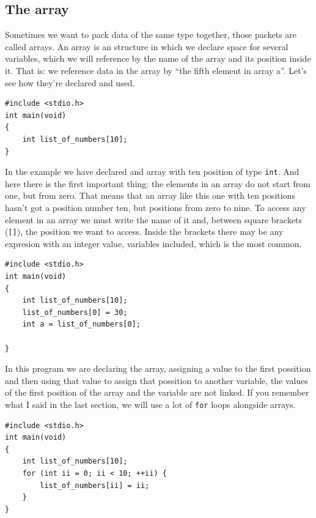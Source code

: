 \documentclass[a4paper]{article}
\begin{document}
\subsection{The array}
Sometimes we want to pack data of the same type together, those packets are
called arrays. An array is an structure in which we declare space for several
variables, which we will reference by the name of the array and its position
inside it. That is: we reference data in the array by ``the fifth element in
array a''. Let's see how they're declared and used.

\noindent
\begin{minipage}[H]{\linewidth}
\mbox{}
\begin{lstlisting}[style=C,
caption={Example of declaration of an array},
label={lst:arrayDeclaration}]
#include <stdio.h>
int main(void)
{
    int list_of_numbers[10];
}
\end{lstlisting}
\end{minipage}

In the example we have declared and array with ten position of type
\texttt{int}. And here there is the first important thing: the elements in an
array do not start from one, but from zero. That means that an array like this
one with ten positions hasn't got a position number ten, but positions from
zero to nine.
To access any element in an array we must write the name of it and, between
square brackets (\verb![]!), the position we want to access. Inside the brackets
there may be any expresion with an integer value, variables included, which
is the most common.

\noindent
\begin{minipage}[H]{\linewidth}
\mbox{}
\begin{lstlisting}[style=C,
caption={Example of ussage of an array},
label={lst:arrayUse}]
#include <stdio.h>
int main(void)
{
    int list_of_numbers[10];
    list_of_numbers[0] = 30;
    int a = list_of_numbers[0];

}
\end{lstlisting}
\end{minipage}

In this program we are declaring the array, assigning a value to the first
possition and then using that value to assign that possition to another
variable, the values of the first position of the array and the variable
are not linked. If you remember what I said in the last section, we will
use a lot of \texttt{for} loops alongside arrays.

\noindent
\begin{minipage}[H]{\linewidth}
\mbox{}
\begin{lstlisting}[style=C,
caption={Example of how to use an array},
label={lst:arrayIteration}]
#include <stdio.h>
int main(void)
{
    int list_of_numbers[10];
    for (int ii = 0; ii < 10; ++ii) {
        list_of_numbers[ii] = ii;
    }
}
\end{lstlisting}
\end{minipage}
\end{document}
